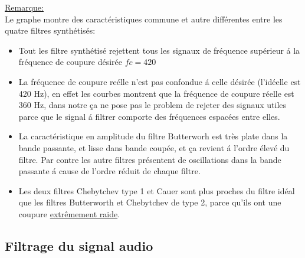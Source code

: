 \documentclass[twoside,twocolumn]{article}
\begin{document}
\underline{Remarque:}\\

Le graphe montre des caractéristiques commune et autre différentes entre les quatre filtres synthétisés: 
\begin{itemize}
\item
Tout les filtre synthétisé rejettent tous les signaux de fréquence supérieur á la fréquence de coupure désirée $fc = 420$
\item
La fréquence de coupure reélle n'est pas confondue á celle désirée (l'idéelle est 420 Hz), en effet les courbes montrent que la fréquence de coupure réelle est 360 Hz, dans notre ça ne pose pas le problem de rejeter des signaux utiles parce que le signal á filtrer comporte des fréquences espacées entre elles.
\item
La caractéristique en amplitude du filtre Butterworh est très plate dans la bande passante, et lisse dans bande coupée, et ça revient á l'ordre élevé du filtre.
Par contre les autre filtres présentent de oscillations dans la bande passante á cause de l'ordre réduit de chaque filtre.

\item
Les deux filtres Chebytchev type 1 et Cauer sont plus proches du filtre idéal que les filtres Butterworth et Chebytchev de type 2, parce qu'ils ont une coupure \underline{extrêmement raide}.
\end{itemize}

\subsection{Filtrage du signal audio}

\label{matlab}

\end{document}
